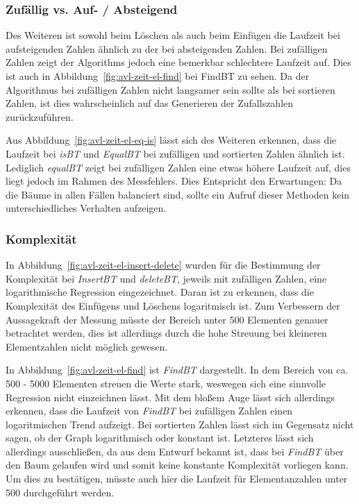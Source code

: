 \subsubsection{Zufällig vs. Auf- / Absteigend}
Des Weiteren ist sowohl beim Löschen als auch beim Einfügen die Laufzeit bei aufsteigenden Zahlen
ähnlich zu der bei absteigenden Zahlen.
Bei zufälligen Zahlen zeigt der Algorithms jedoch eine bemerkbar schlechtere Laufzeit auf.
Dies ist auch in Abbildung~\ref{fig:avl-zeit-el-find} bei FindBT zu sehen.
Da der Algorithmus bei zufälligen Zahlen nicht langsamer sein sollte als bei sortieren Zahlen, ist
dies wahrscheinlich auf das Generieren der Zufallszahlen zurückzuführen.

Aus Abbildung~\ref{fig:avl-zeit-el-eq-is} lässt sich des Weiteren erkennen, dass die Laufzeit
bei \textit{isBT} und \textit{EqualBT} bei zufälligen und sortierten Zahlen ähnlich ist.
Lediglich \textit{equalBT} zeigt bei zufälligen Zahlen eine etwas höhere Laufzeit auf, dies liegt
jedoch im Rahmen des Messfehlers.
Dies Entspricht den Erwartungen: Da die Bäume in allen Fällen balanciert sind, sollte ein Aufruf
dieser Methoden kein unterschiedliches Verhalten aufzeigen.

\subsubsection{Komplexität}
In Abbildung~\ref{fig:avl-zeit-el-insert-delete} wurden für die Bestimmung der Komplexität
bei \textit{InsertBT} und \textit{deleteBT}, jeweils mit zufälligen Zahlen, eine logarithmische
Regression eingezeichnet.
Daran ist zu erkennen, dass die Komplexität des Einfügens und Löschens logaritmisch ist.
Zum Verbessern der Aussagekraft der Messung müsste der Bereich unter 500 Elementen genauer
betrachtet werden, dies ist allerdings durch die hohe Streuung bei kleineren Elementzahlen nicht
möglich gewesen.

In Abbildung~\ref{fig:avl-zeit-el-find} ist \textit{FindBT} dargestellt.
In dem Bereich von ca. 500 - 5000 Elementen streuen die Werte stark, weswegen sich eine sinnvolle
Regression nicht einzeichnen lässt.
Mit dem bloßem Auge lässt sich allerdings erkennen, dass die Laufzeit von \textit{FindBT} bei
zufälligen
Zahlen einen logaritmischen Trend aufzeigt.
Bei sortierten Zahlen lässt sich im Gegensatz nicht sagen, ob der Graph logarithmisch oder konstant
ist.
Letzteres lässt sich allerdings ausschließen, da aus dem Entwurf bekannt ist, dass bei
\textit{FindBT} über
den Baum gelaufen wird und somit keine konstante Komplexität vorliegen kann.
Um dies zu bestätigen, müsste auch hier die Laufzeit für Elementanzahlen unter 500
durchgeführt werden.

